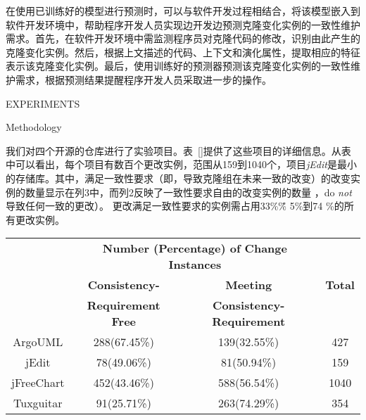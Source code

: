 在使用已训练好的模型进行预测时，可以与软件开发过程相结合，将该模型嵌入到软件开发环境中，帮助程序开发人员实现边开发边预测克隆变化实例的一致性维护需求。首先，在软件开发环境中需监测程序员对克隆代码的修改，识别由此产生的克隆变化实例。然后，根据上文描述的代码、上下文和演化属性，提取相应的特征表示该克隆变化实例。最后，使用训练好的预测器预测该克隆变化实例的一致性维护需求，根据预测结果提醒程序开发人员采取进一步的操作。




{EXPERIMENTS}

{Methodology}

我们对四个开源的仓库进行了实验项目。表~\ref {}提供了这些项目的详细信息。从表中可以看出，每个项目有数百个更改实例，范围从159到1040个，项目{\em  jEdit}是最小的存储库。其中，满足一致性要求（即，导致克隆组在未来一致的改变）的改变实例的数量显示在列3中，而列2反映了一致性要求自由的改变实例的数量 ，do {\em not }导致任何一致的更改）。
更改满足一致性要求的实例需占用33\%\~\% 5\%到74 \%的所有更改实例。

\begin{table}[htbp]
\vspace{0.5em}\centering\wuhao
\begin{tabular}{cccc}
\toprule[1.5pt]
~\multirow{3}{*}{\textbf{Project}}& \multicolumn{2}{c}{\textbf{Number (Percentage) of Change Instances}} & \multirow{3}{*}{\textbf{Total}}\\ 
 \cline{2-3}
 ~& \textbf{Consistency-} &\textbf{Meeting} & ~\\
 &\textbf{Requirement Free}&\textbf{Consistency-Requirement}&\\
\midrule[1pt]
ArgoUML&288(67.45\%)&139(32.55\%)&427\\
jEdit&78(49.06\%)&81(50.94\%)&159\\
jFreeChart&452(43.46\%)&588(56.54\%)&1040\\
Tuxguitar&91(25.71\%)&263(74.29\%)&354\\
\bottomrule[1.5pt]
\end{tabular}
\end{table}

